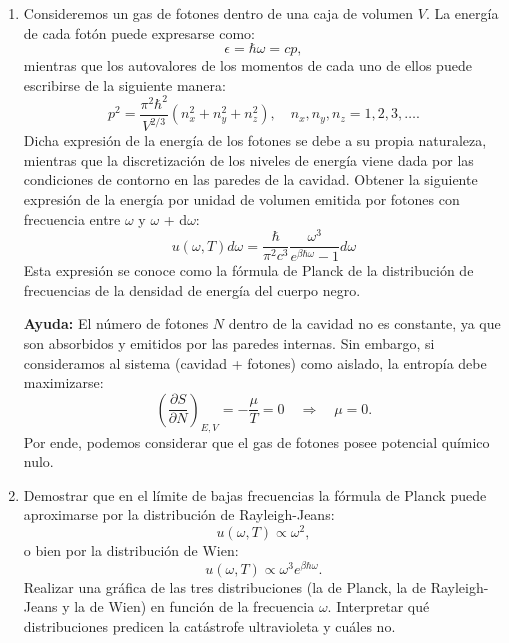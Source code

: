 \documentclass[a4paper,11pt]{article}
\begin{document}
\begin{enumerate}[label=(\alph*),
                  leftmargin=2\parindent,
                  rightmargin=2\parindent]

     \item{Consideremos un gas de fotones dentro de una caja de volumen $V$.
           La energía de cada fotón puede expresarse como:
           $$ \epsilon = \hbar \omega = c p , $$
           mientras que los autovalores de los momentos de cada uno de ellos 
           puede escribirse de la siguiente manera:
           $$
           p^2 = \frac{\pi^2 \hbar^2}{V^{2/3}}
           \left( n_x^2 + n_y^2 + n_z^2 \right), \quad
           n_x, n_y, n_z = 1, 2, 3, \dots .
           $$
           Dicha expresión de la energía de los fotones se debe a su propia 
           naturaleza, mientras que la discretización de los niveles de 
           energía viene dada por las condiciones de contorno en las paredes 
           de la cavidad.
           Obtener la siguiente expresión de  la energía por unidad de volumen 
           emitida por fotones con frecuencia entre $\omega$ y $\omega$ + 
           d$\omega$:
           $$
           u(\omega, T)d\omega = \frac{\hbar}{\pi^2 c^3}
           \frac{\omega^3}{e^{\beta \hbar \omega} - 1} d\omega
           $$
           Esta expresión se conoce como la fórmula de Planck de la 
           distribución de frecuencias de la densidad de energía del cuerpo 
           negro.
           }

     {\small
     \textbf{Ayuda:}
     El número de fotones $N$ dentro de la cavidad no es constante, ya que 
     son absorbidos y emitidos por las paredes internas.
     Sin embargo, si consideramos al sistema (cavidad + fotones) como aislado, 
     la entropía debe maximizarse:
     $$
     \left( \frac{\partial S}{\partial N} \right)_{E, V} =
     - \frac{\mu}{T} = 0 \quad \Rightarrow \quad \mu = 0.
     $$
     Por ende, podemos considerar que el gas de fotones posee potencial 
     químico nulo.
     }
     
     \item{Demostrar que en el límite de bajas frecuencias la fórmula de 
           Planck puede aproximarse por la distribución de Rayleigh-Jeans:
           $$ u(\omega, T) \propto \omega^2, $$
           o bien por la distribución de Wien:
           $$ u(\omega, T) \propto \omega^3 e^{\beta \hbar \omega}. $$
           Realizar una gráfica de las tres distribuciones (la de Planck, la 
           de Rayleigh-Jeans y la de Wien) en función de la frecuencia 
           $\omega$.
           Interpretar qué distribuciones predicen la catástrofe 
           ultravioleta y cuáles no.
           }
     

\end{enumerate}
\end{document}
